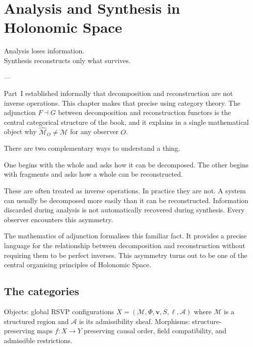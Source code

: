 
\chapter{Analysis and Synthesis in Holonomic Space}
\label{ch:analysis-synthesis}

\epigraph{%
  Analysis loses information.\\
  Synthesis reconstructs only what survives.%
}{---}

\begin{WhyChapter}
  Part~I established informally that decomposition and
  reconstruction are not inverse operations.
  This chapter makes that precise using category theory.
  The adjunction $F \dashv G$ between decomposition and
  reconstruction functors is the central categorical structure
  of the book, and it explains in a single mathematical object
  why $\widehat{\mathcal{M}}_O \neq \mathcal{M}$ for any
  observer $O$.
\end{WhyChapter}


\begin{ChapterIntro}
There are two complementary ways to understand a thing.

One begins with the whole and asks how it can be decomposed. The other begins with fragments and asks how a whole can be reconstructed.

These are often treated as inverse operations. In practice they are not. A system can usually be decomposed more easily than it can be reconstructed. Information discarded during analysis is not automatically recovered during synthesis. Every observer encounters this asymmetry.

The mathematics of adjunction formalises this familiar fact. It provides a precise language for the relationship between decomposition and reconstruction without requiring them to be perfect inverses. This asymmetry turns out to be one of the central organising principles of Holonomic Space.
\end{ChapterIntro}

\section{The categories}

\begin{definition}
  \label{def:glob}
  Objects: global RSVP configurations
  $X = (\mathcal{M}, \Phi, \mathbf{v}, S, \ell, \mathcal{A})$
  where $\mathcal{M}$ is a structured region and $\mathcal{A}$
  is its admissibility sheaf.
  Morphisms: structure-preserving maps $f : X \to Y$
  preserving causal order, field compatibility, and admissible
  restrictions.
\end{definition}

